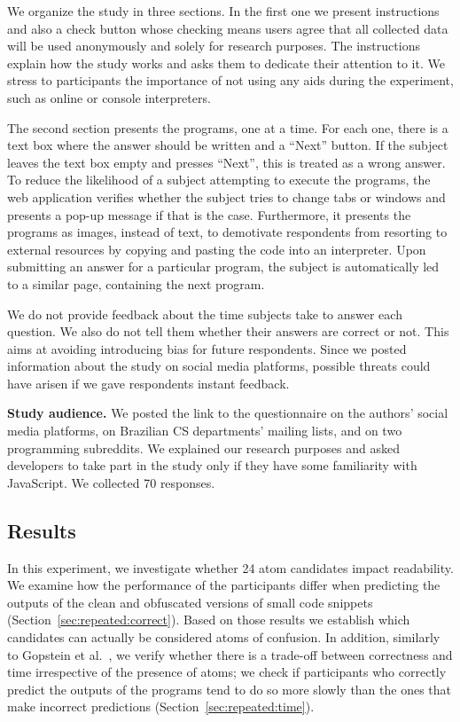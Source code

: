 We organize the study in three sections. In the first one we present instructions and also a check button whose checking means users agree that all collected data will be used anonymously and solely for research purposes. The instructions explain how the study works and asks them to dedicate their attention to it. We stress to participants the importance of not using any aids during the experiment, such as online or console interpreters. 

The second section presents the programs, one at a time. For each one, there is a text box where the answer should be written and a ``Next'' button. If the subject leaves the text box empty and presses ``Next'', this is treated as a wrong answer. To reduce the likelihood of a subject attempting to execute the programs, the web application verifies whether the subject tries to change tabs or windows and presents a pop-up message if that is the case. Furthermore, it presents the programs as images, instead of text, to demotivate respondents from resorting to external resources by copying and pasting the code into an interpreter. Upon submitting an answer for a particular program, the subject is automatically led to a similar page, containing the next program.

We do not provide feedback about the time subjects take to answer each question. We also do not tell them whether their answers are correct or not. This aims at avoiding introducing bias for future respondents. Since we posted information about the study on social media platforms, possible threats could have arisen if we gave respondents instant feedback.


{\bf Study audience.} We posted the link to the questionnaire on the authors' social media platforms, on Brazilian CS departments' mailing lists, and on two programming subreddits. We explained our research purposes and asked developers to take part in the study only if they have some familiarity with JavaScript. We collected 70 responses. %


\subsection{Results}\label{sec:repeated}

In this experiment, we investigate whether 24 atom candidates impact readability. We examine how the performance of the participants differ when predicting the outputs of the clean and obfuscated versions of small code snippets (Section~\ref{sec:repeated:correct}). Based on those results we establish which candidates can actually be considered atoms of confusion. In addition, similarly to Gopstein et al.~\cite{DBLP:conf/sigsoft/GopsteinIYDZYC17}, we verify whether there is a trade-off between correctness and time irrespective of the presence of atoms; we check if participants who correctly predict the outputs of the programs tend to do so more slowly than the ones that make incorrect predictions (Section~\ref{sec:repeated:time}). 


